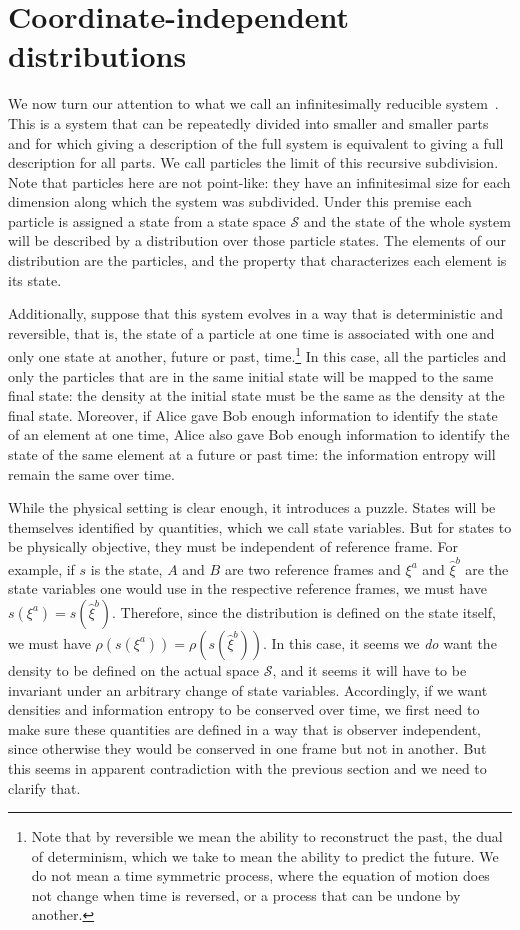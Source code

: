 \documentclass[11pt]{elsarticle}
\begin{document}
\section{Coordinate-independent distributions}

We now turn our attention to what we call an infinitesimally reducible system~\cite{AoPPhy1}. This is a system that can be repeatedly divided into smaller and smaller parts and for which giving a description of the full system is equivalent to giving a full description for all parts. We call particles the limit of this recursive subdivision. Note that particles here are not point-like: they have an infinitesimal size for each dimension along which the system was subdivided. Under this premise each particle is assigned a state from a state space $\mathcal{S}$ and the state of the whole system will be described by a distribution over those particle states. The elements of our distribution are the particles, and the property that characterizes each element is its state.

Additionally, suppose that this system evolves in a way that is deterministic and reversible, that is, the state of a particle at one time is associated with one and only one state at another, future or past, time.\footnote{Note that by reversible we mean the ability to reconstruct the past, the dual of determinism, which we take to mean the ability to predict the future. We do not mean a time symmetric process, where the equation of motion does not change when time is reversed, or a process that can be undone by another.} In this case, all the particles and only the particles that are in the same initial state will be mapped to the same final state: the density at the initial state must be the same as the density at the final state. Moreover, if Alice gave Bob enough information to identify the state of an element at one time, Alice also gave Bob enough information to identify the state of the same element at a future or past time: the information entropy will remain the same over time.

While the physical setting is clear enough, it introduces a puzzle. States will be themselves identified by quantities, which we call state variables. But for states to be physically objective, they must be independent of reference frame. For example, if $s$ is the state, $A$ and $B$ are two reference frames and $\xi^a$ and $\hat{\xi}^b$ are the state variables one would use in the respective reference frames, we must have $s(\xi^a) = s(\hat{\xi}^b)$.  Therefore, since the distribution is defined on the state itself, we must have $\rho(s(\xi^a))=\rho(s(\hat{\xi}^b))$. In this case, it seems we \emph{do} want the density to be defined on the actual space $\mathcal{S}$, and it seems it will have to be invariant under an arbitrary change of state variables. Accordingly, if we want densities and information entropy to be conserved over time, we first need to make sure these quantities are defined in a way that is observer independent, since otherwise they would be conserved in one frame but not in another. But this seems in apparent contradiction with the previous section and we need to clarify that.
\end{document}
